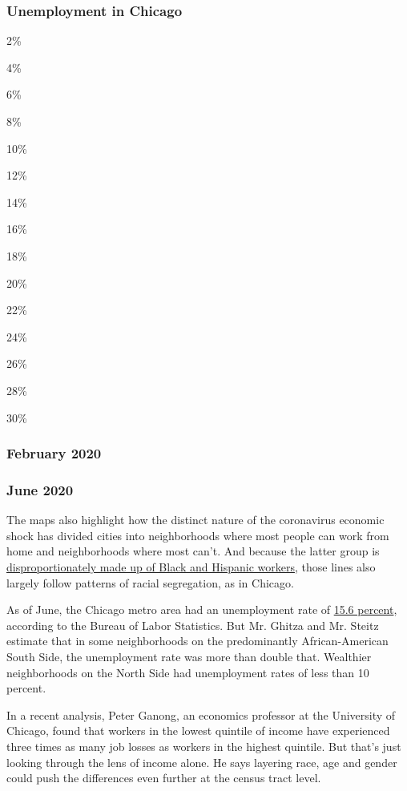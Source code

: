 \hypertarget{unemployment-in-chicago}{%
\subsubsection{Unemployment in Chicago}\label{unemployment-in-chicago}}

2\%

4\%

6\%

8\%

10\%

12\%

14\%

16\%

18\%

20\%

22\%

24\%

26\%

28\%

30\%

\hypertarget{february-2020-1}{%
\subsubsection{February 2020}\label{february-2020-1}}

\hypertarget{june-2020-1}{%
\subsubsection{June 2020}\label{june-2020-1}}

The maps also highlight how the distinct nature of the coronavirus
economic shock has divided cities into neighborhoods where most people
can work from home and neighborhoods where most can't. And because the
latter group is
\href{https://www.bls.gov/cps/effects-of-the-coronavirus-covid-19-pandemic.htm}{disproportionately
made up of Black and Hispanic workers}, those lines also largely follow
patterns of racial segregation, as in Chicago.

As of June, the Chicago metro area had an unemployment rate of
\href{https://www.bls.gov/web/metro/laulrgma.htm}{15.6 percent},
according to the Bureau of Labor Statistics. But Mr. Ghitza and Mr.
Steitz estimate that in some neighborhoods on the predominantly
African-American South Side, the unemployment rate was more than double
that. Wealthier neighborhoods on the North Side had unemployment rates
of less than 10 percent.

In a recent analysis, Peter Ganong, an economics professor at the
University of Chicago, found that workers in the lowest quintile of
income have experienced three times as many job losses as workers in the
highest quintile. But that's just looking through the lens of income
alone. He says layering race, age and gender could push the differences
even further at the census tract level.

